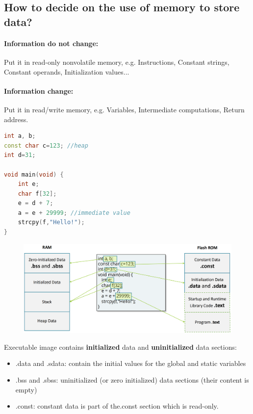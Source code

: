 \subsection{How to decide on the use of memory to store data?}

\paragraph{Information do not change: } Put it in read-only nonvolatile memory, e.g. Instructions, Constant strings, Constant
operands,
Initialization values...

\paragraph{Information change: } Put it in read/write memory, e.g. Variables, Intermediate computations,
Return address.

\begin{center}
    

\begin{lstlisting}[language=c++]
int a, b;
const char c=123; //heap
int d=31;

void main(void) {
    int e;
    char f[32];
    e = d + 7;
    a = e + 29999; //immediate value
    strcpy(f,"Hello!");
}
\end{lstlisting}
\end{center}

\begin{figure}[H]
    \centering
    \includegraphics[width=0.85\linewidth]{img/image34.png}
\end{figure}


Executable image contains \textbf{initialized} data and \textbf{uninitialized} data sections:

\begin{itemize}
    \item .data and .sdata: contain the initial values for the global and static variables
    \item .bss and .sbss: uninitialized (or zero initialized) data sections (their content is empty)
    \item .const: constant data is part of the.const section which is read-only.
\end{itemize}


